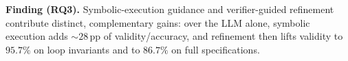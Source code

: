 \begin{finding}
\textbf{Finding (RQ3).} Symbolic-execution guidance and verifier-guided refinement contribute distinct, complementary gains: over the LLM alone, symbolic execution adds ${\sim}28$\,pp of validity/accuracy, and refinement then lifts validity to $95.7\%$ on loop invariants and to $86.7\%$ on full specifications.
\end{finding}
